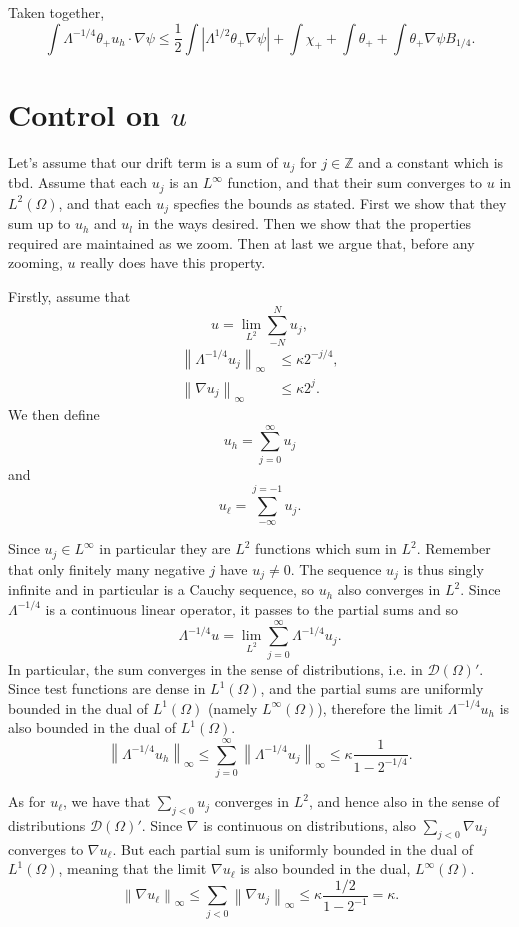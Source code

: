 \documentclass[11pt]{amsart}
\theoremstyle{remark}
\newcommand{\Z}{\mathbb{Z}}
\newcommand{\norm}[1]{\left\lVert#1\right\rVert}
\newcommand{\abs}[1]{\left\lvert #1 \right\rvert}
\newcommand{\grad}{\nabla}
\newcommand{\test}{\mathcal{D}}
\begin{document}
Taken together,
\[ \int \Lambda^{-1/4} \theta_+ u_h \cdot \grad \psi \leq \frac{1}{2} \int \abs{\Lambda^{1/2} \theta_+ \grad \psi} + \int \chi_+ + \int \theta_+ + \int \theta_+ \grad \psi B_{1/4}. \]


\section{Control on $u$}
Let's assume that our drift term is a sum of $u_j$ for $j \in \Z$ and a constant which is tbd.  Assume that each $u_j$ is an $L^\infty$ function, and that their sum converges to $u$ in $L^2(\Omega)$, and that each $u_j$ specfies the bounds as stated.  First we show that they sum up to $u_h$ and $u_l$ in the ways desired.  Then we show that the properties required are maintained as we zoom.  Then at last we argue that, before any zooming, $u$ really does have this property.  

Firstly, assume that 
\[ u = \lim_{L^2} \sum_{-N}^N u_j, \]
\begin{align*} 
\norm{\Lambda^{-1/4} u_j}_\infty &\leq \kappa 2^{-j/4}, \\
\norm{\grad u_j}_\infty &\leq \kappa 2^j. 
\end{align*}
We then define
\[ u_h = \sum_{j=0}^\infty u_j \]
and 
\[ u_\ell = \sum_{-\infty}^{j=-1} u_j. \]

Since $u_j \in L^\infty$ in particular they are $L^2$ functions which sum in $L^2$.  Remember that only finitely many negative $j$ have $u_j \neq 0$.  The sequence $u_j$ is thus singly infinite and in particular is a Cauchy sequence, so $u_h$ also converges in $L^2$.  Since $\Lambda^{-1/4}$ is a continuous linear operator, it passes to the partial sums and so
\[ \Lambda^{-1/4} u = \lim_{L^2} \sum_{j=0}^\infty \Lambda^{-1/4} u_j. \]
In particular, the sum converges in the sense of distributions, i.e. in $\test(\Omega)'$.  Since test functions are dense in $L^1(\Omega)$, and the partial sums are uniformly bounded in the dual of $L^1(\Omega)$ (namely $L^\infty(\Omega)$), therefore the limit $\Lambda^{-1/4} u_h$ is also bounded in the dual of $L^1(\Omega)$.  
\[ \norm{\Lambda^{-1/4} u_h}_\infty \leq \sum_{j=0}^\infty \norm{\Lambda^{-1/4} u_j}_\infty \leq \kappa \frac{1}{1-2^{-1/4}}. \]

As for $u_\ell$, we have that $\sum_{j < 0} u_j$ converges in $L^2$, and hence also in the sense of distributions $\test(\Omega)'$.  Since $\grad$ is continuous on distributions, also $\sum_{j<0} \grad u_j$ converges to $\grad u_\ell$.  But each partial sum is uniformly bounded in the dual of $L^1(\Omega)$, meaning that the limit $\grad u_\ell$ is also bounded in the dual, $L^\infty(\Omega)$.  
\[ \norm{\grad u_\ell}_\infty \leq \sum_{j < 0} \norm{\grad u_j}_\infty \leq \kappa \frac{1/2}{1 - 2^{-1}} = \kappa. \]
\end{document}
